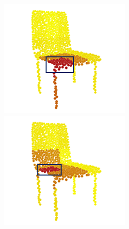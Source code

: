 \documentclass[letterpaper]{article} %
\begin{document}
\begin{figure}[htbp]
\begin{center}
\begin{minipage}[b]{0.8\linewidth}
\begin{center}
\begin{minipage}[b]{0.12\linewidth}
\begin{center}
\end{center}
\end{minipage}
\begin{minipage}[b]{0.12\linewidth}
\begin{center}
\includegraphics[width=1.0\linewidth]{images/atten_pic/chair_attention_1.png}
\end{center}
\end{minipage}
\begin{minipage}[b]{0.12\linewidth}
\begin{center}
\includegraphics[width=1.0\linewidth]{images/atten_pic/chair_attention_2.png}

\end{center}
\end{minipage}
\end{center}
\end{minipage}
\end{center}
\end{figure}
\end{document}
